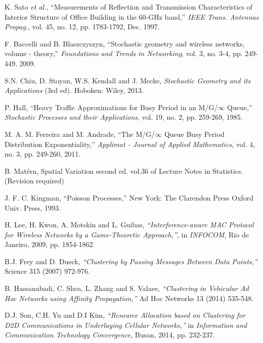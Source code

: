 \documentclass[10pt, conference, letterpaper]{IEEEtran}
\newcommand*{\Rom}[1]{\uppercase\expandafter{\romannumeral #1\relax}} %
\begin{document}
\begin{thebibliography}{50}

K. Sato \emph{et al.}, ``Measurements of Reflection and Transmission Characteristics of Interior Structure of Office Building in the 60-GHz band,'' \emph{IEEE Trans. Antennas Propag.}, vol. 45, no. 12, pp. 1783-1792, Dec. 1997.

F. Baccelli and B. Blaszczyszyn, ``Stochastic geometry and wireless networks, volume \Rom{1} - theory,'' \emph{Foundations and Trends in Networking}, vol. 3, no. 3-4, pp. 249-449, 2009.

S.N. Chiu, D. Stoyan, W.S. Kendall and J. Mecke, \emph{Stochastic Geometry and its Applications} (3rd ed). Hoboken: Wiley, 2013. 

P. Hall, ``Heavy Traffic Approximations for Busy Period in an M/G/$\infty$ Queue,'' \emph{Stochastic Processes and their Applications}, vol. 19, no. 2, pp. 259-269, 1985.

M. A. M. Ferreira and M. Andrade, ``The M/G/$\infty$ Queue Busy Period Distribution Exponentiality,'' \emph{Applimat - Journal of Applied Mathematics}, vol. 4, no. 3, pp. 249-260, 2011.


B. Mat\'ern, Spatial Variation second ed. vol.36 of Lecture Notes in Statistics. (Revision required)

J. F. C. Kingman, ``Poisson Processes,'' New York: The Clarendon Press Oxford Univ. Press, 1993.


H. Lee, H. Kwon, A. Motskin and  L. Guibas, \emph{``Interference-aware MAC Protocol for Wireless Networks by a Game-Theoretic Approach,''}, in \emph{INFOCOM}, Rio de Janeiro, 2009, pp. 1854-1862.

B.J. Frey and D. Dueck, \emph{``Clustering by Passing Messages Between Data Points,''} Science 315 (2007) 972-976.

B. Hassanabadi, C. Shea, L. Zhang and S. Valaee, \emph{``Clustering in Vehicular Ad Hoc Networks using Affinity Propagation,''} Ad Hoc Networks 13 (2014) 535-548.

D.J. Son, C.H. Yu and D.I Kim, \emph{``Resource Allocation based on Clustering for D2D Communications in Underlaying Cellular Networks,''} in \emph{Information and Communication Technology Convergence}, Busan, 2014, pp. 232-237.

\end{thebibliography}
\end{document}
